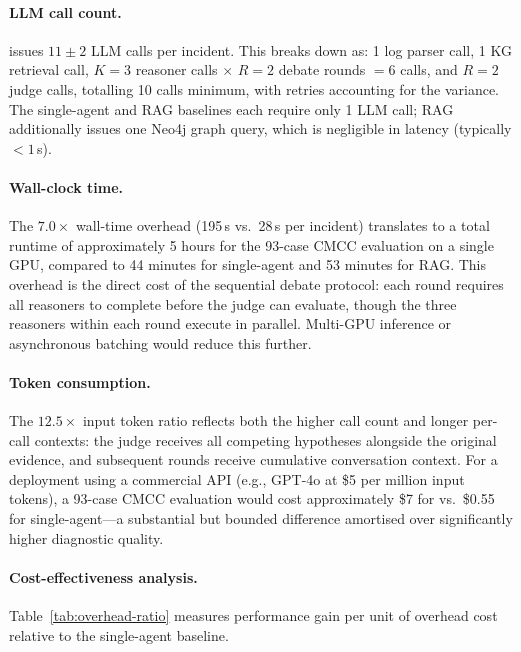 \paragraph{LLM call count.}
\systemname{} issues $11 \pm 2$ LLM calls per incident. This breaks down as: 1 log parser call,
1 KG retrieval call, $K{=}3$ reasoner calls $\times$ $R{=}2$ debate rounds $= 6$ calls, and
$R{=}2$ judge calls, totalling 10 calls minimum, with retries accounting for the variance. The
single-agent and RAG baselines each require only 1 LLM call; RAG additionally issues one Neo4j
graph query, which is negligible in latency (typically $<1$\,s).

\paragraph{Wall-clock time.}
The $7.0\times$ wall-time overhead (195\,s vs.\ 28\,s per incident) translates to a total
runtime of approximately 5 hours for the 93-case CMCC evaluation on a single GPU, compared to
44 minutes for single-agent and 53 minutes for RAG. This overhead is the direct cost of the
sequential debate protocol: each round requires all reasoners to complete before the judge can
evaluate, though the three reasoners within each round execute in parallel. Multi-GPU inference
or asynchronous batching would reduce this further.

\paragraph{Token consumption.}
The $12.5\times$ input token ratio reflects both the higher call count and longer per-call
contexts: the judge receives all competing hypotheses alongside the original evidence, and
subsequent rounds receive cumulative conversation context. For a deployment using a commercial
API (e.g., GPT-4o at \$5 per million input tokens), a 93-case CMCC evaluation would cost
approximately \$7 for \systemname{} vs.\ \$0.55 for single-agent---a substantial but bounded
difference amortised over significantly higher diagnostic quality.

\paragraph{Cost-effectiveness analysis.}
Table~\ref{tab:overhead-ratio} measures performance gain per unit of overhead cost relative to
the single-agent baseline.

